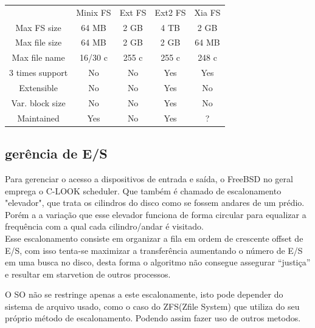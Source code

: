 \documentclass[conference]{IEEEtran}
\begin{document}
\begin{center}
	\begin{tabular}{c|c|c|c|c}
		\hline
		 & Minix FS & Ext FS & Ext2 FS & Xia FS \\
		Max FS size & 64 MB & 2 GB & 4 TB & 2 GB \\
		Max file size & 64 MB & 2 GB & 2 GB & 64 MB \\
		Max file name & 16/30 c & 255 c &255 c & 248 c \\
		3 times support & No & No & Yes & Yes \\
		Extensible & No & No & Yes & No \\
		Var. block size & No & No & Yes & No \\
		Maintained & Yes & No & Yes & ?
	\end{tabular}
\end{center}

\subsection{gerência de E/S}\label{sec:BSDES}
Para gerenciar o acesso a dispositivos de entrada e saída, o FreeBSD no geral emprega o C-LOOK scheduler\cite{FreeBSD-Hybrid}. Que também é chamado de escalonamento "elevador", que trata os cilindros do disco como se fossem andares de um prédio. Porém a a variação que esse elevador funciona de forma circular para equalizar a frequência com a qual cada cilindro/andar é visitado.\\

Esse escalonamento consiste em organizar a fila em ordem de crescente offset de E/S, com isso tenta-se maximizar a transferência aumentando o número de E/S em uma busca no disco, desta forma o algoritmo não consegue assegurar “justiça” e resultar em starvetion de outros processos.
 
O SO não se restringe apenas a este escalonamente, isto pode depender do sistema de arquivo usado, como o caso do ZFS(Zfile System) que utiliza do seu próprio método de escalonamento. Podendo assim fazer uso de outros metodos. \\
\end{document}
